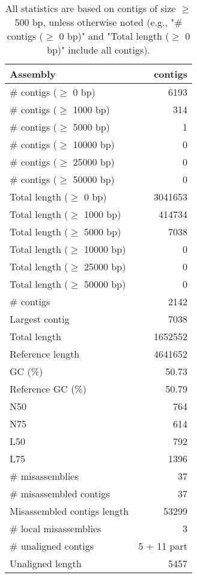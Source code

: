 \documentclass[12pt,a4paper]{article}
\begin{document}
\begin{table}[ht]
\begin{center}
\caption{All statistics are based on contigs of size $\geq$ 500 bp, unless otherwise noted (e.g., "\# contigs ($\geq$ 0 bp)" and "Total length ($\geq$ 0 bp)" include all contigs).}
\begin{tabular}{|l*{1}{|r}|}
\hline
Assembly & contigs \\ \hline
\# contigs ($\geq$ 0 bp) & 6193 \\ \hline
\# contigs ($\geq$ 1000 bp) & 314 \\ \hline
\# contigs ($\geq$ 5000 bp) & 1 \\ \hline
\# contigs ($\geq$ 10000 bp) & 0 \\ \hline
\# contigs ($\geq$ 25000 bp) & 0 \\ \hline
\# contigs ($\geq$ 50000 bp) & 0 \\ \hline
Total length ($\geq$ 0 bp) & 3041653 \\ \hline
Total length ($\geq$ 1000 bp) & 414734 \\ \hline
Total length ($\geq$ 5000 bp) & 7038 \\ \hline
Total length ($\geq$ 10000 bp) & 0 \\ \hline
Total length ($\geq$ 25000 bp) & 0 \\ \hline
Total length ($\geq$ 50000 bp) & 0 \\ \hline
\# contigs & 2142 \\ \hline
Largest contig & 7038 \\ \hline
Total length & 1652552 \\ \hline
Reference length & 4641652 \\ \hline
GC (\%) & 50.73 \\ \hline
Reference GC (\%) & 50.79 \\ \hline
N50 & 764 \\ \hline
N75 & 614 \\ \hline
L50 & 792 \\ \hline
L75 & 1396 \\ \hline
\# misassemblies & 37 \\ \hline
\# misassembled contigs & 37 \\ \hline
Misassembled contigs length & 53299 \\ \hline
\# local misassemblies & 3 \\ \hline
\# unaligned contigs & 5 + 11 part \\ \hline
Unaligned length & 5457 \\ \hline

\end{tabular}
\end{center}
\end{table}
\end{document}
